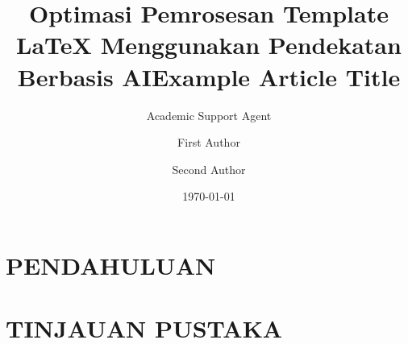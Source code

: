 \documentclass{physiome}
\title{Optimasi Pemrosesan Template LaTeX Menggunakan Pendekatan Berbasis AI}
\author{Academic Support Agent}
\date{\today}
\begin{document}
\maketitle

\begin{abstract}

\end{abstract}

\chapter{PENDAHULUAN}


\chapter{TINJAUAN PUSTAKA}




\title{Example Article Title}

\author[1][corr.author@xyz.ac.mm]{First Author}
\author[2]{Second Author}
\end{document}
